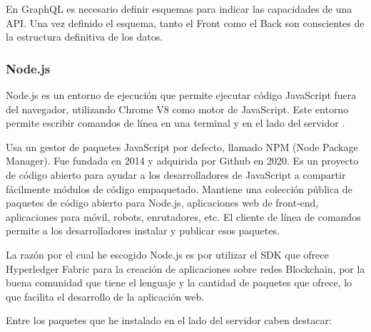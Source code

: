 \vspace{5mm}

\noindent En GraphQL es necesario definir esquemas para indicar las capacidades de una API. Una vez definido el esquema, 
tanto el Front como el Back son conscientes de la estructura definitiva de los datos.

\subsubsection*{Node.js}

Node.js es un entorno de ejecución que permite ejecutar código JavaScript fuera del navegador, utilizando Chrome V8 
como motor de JavaScript. Este entorno permite escribir comandos de línea en una terminal y  en el lado 
del servidor \cite{what-is-nodejs}.

\vspace{5mm}

\noindent Usa un gestor de paquetes JavaScript por defecto, llamado NPM (Node Package Manager). Fue fundada en 2014 y
adquirida por Github en 2020. Es un proyecto de código abierto para ayudar a los desarrolladores de JavaScript a
compartir fácilmente módulos de código empaquetado. Mantiene una colección pública de paquetes de código abierto
para Node.js, aplicaciones web de front-end, aplicaciones para móvil, robots, enrutadores, etc. El cliente de línea 
de comandos permite a los desarrolladores instalar y publicar esos paquetes.

\vspace{5mm}

\noindent La razón por el cual he escogido Node.js es por utilizar el SDK que ofrece Hyperledger Fabric para la 
creación de aplicaciones sobre redes Blockchain, por la buena comunidad que tiene el lenguaje y la cantidad de 
paquetes que ofrece, lo que facilita el desarrollo de la aplicación web.

\vspace{5mm}

\noindent Entre los paquetes que he instalado en el lado del servidor caben destacar:


